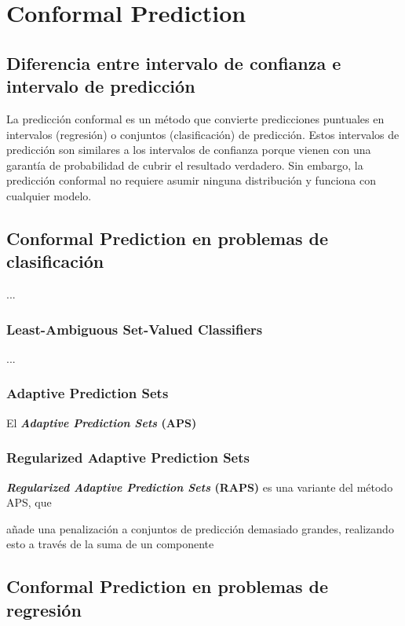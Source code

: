 \section{Conformal Prediction}


\subsection{Diferencia entre intervalo de confianza e intervalo de predicción}

La predicción conformal es un método que convierte predicciones puntuales en intervalos (regresión) o conjuntos 
(clasificación) de predicción. Estos intervalos de predicción son similares a los intervalos de confianza porque 
vienen con una garantía de probabilidad de cubrir el resultado verdadero. Sin embargo, la predicción conformal
no requiere asumir ninguna distribución y funciona con cualquier modelo.


\subsection{Conformal Prediction en problemas de clasificación}

...

\subsubsection{Least-Ambiguous Set-Valued Classifiers}

...

\subsubsection{Adaptive Prediction Sets}

El \textbf{\textit{Adaptive Prediction Sets} (APS)} \cite{romano2020}

\subsubsection{Regularized Adaptive Prediction Sets}

\textbf{\textit{Regularized Adaptive Prediction Sets} (RAPS)} \cite{angelopoulos2020} es una variante del método APS, 
que 

añade una penalización a conjuntos de predicción demasiado grandes, realizando esto a través 
de la suma de un componente 




\subsection{Conformal Prediction en problemas de regresión}


